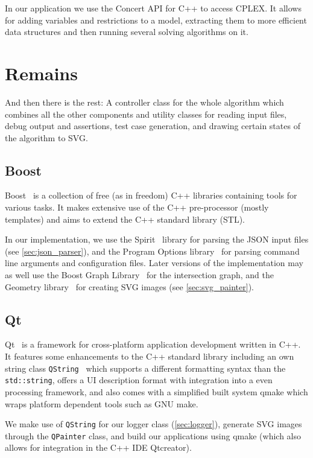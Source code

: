 In our application we use the Concert API for C++ \cite{cplex_concert}
to access CPLEX. It allows for adding variables and restrictions to
a model, extracting them to more efficient data structures and then
running several solving algorithms on it.

\section{Remains}
And then there is the rest: A controller
class for the whole algorithm which combines all the other components
and utility classes for reading input files, debug
output and assertions, test case generation, and drawing certain 
states of the algorithm to SVG.

\subsection{Boost}
\label{sec:boost}
Boost~\cite{boost} is a collection of free (as in freedom) C++
libraries containing tools for various tasks. It makes extensive use
of the C++ pre-processor (mostly templates) and aims to extend the
C++ standard library (STL).

In our implementation, we use the Spirit~\cite{boost_spirit} library
for parsing the JSON input files (see \cref{sec:json_parser}), and
the Program Options library~\cite{boost_program_options} for parsing
command line arguments and configuration files. Later versions of the
implementation may as well use the Boost Graph
Library~\cite{boost_graph} for the intersection graph, and the
Geometry library~\cite{boost_geometry} for creating SVG images
(see \cref{sec:svg_painter}).

\subsection{Qt}
\label{sec:Qt}
Qt~\cite{qt} is a framework for cross-platform application development
written in C++. It features some enhancements to the C++ standard
library including an own string class
\verb|QString|~\cite{qt_manual_qstring} which supports
a different formatting syntax than the \verb|std::string|, offers
a UI description format with integration into a even processing
framework, and also comes with a simplified built system qmake which
wraps platform dependent tools such as GNU make.

We make use of \verb|QString| for our logger class
(\cref{sec:logger}), generate SVG images through the \verb|QPainter|
class, and build our applications using qmake (which also allows
for integration in the C++ IDE Qtcreator).

